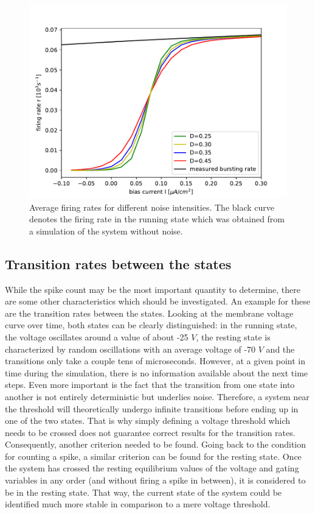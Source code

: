 \documentclass[12pt,a4paper]{article}
\begin{document}
\begin{figure}[H]
	\centering
	\includegraphics[scale=1]{firingrate.pdf}\caption{Average firing rates for different noise intensities. The black curve denotes the firing rate in the running state which was obtained from a simulation of the system without noise.}
	\label{rate}
\end{figure}
\subsection{Transition rates between the states}
While the spike count may be the most important quantity to determine, there are some other characteristics which should be investigated. An example for these are the transition rates between the states. Looking at the membrane voltage curve over time, both states can be clearly distinguished: in the running state, the voltage oscillates around a value of about -25 $V$, the resting state is characterized by random oscillations with an average voltage of -70 $V$ and the transitions only take a couple tens of microseconds. However, at a given point in time during the simulation, there is no information available about the next time steps. Even more important is the fact that the transition from one state into another is not entirely deterministic but underlies noise. Therefore, a system near the threshold will theoretically undergo infinite transitions before ending up in one of the two states. That is why simply defining a voltage threshold which needs to be crossed does not guarantee correct results for the transition rates. Consequently, another criterion needed to be found. Going back to the condition for counting a spike, a similar criterion can be found for the resting state. Once the system has crossed the resting equilibrium values of the voltage and gating variables in any order (and without firing a spike in between), it is considered to be in the resting state. That way, the current state of the system could be identified much more stable in comparison to a mere voltage threshold.
\end{document}
